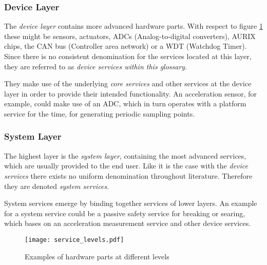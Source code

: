\subsubsection{Device Layer}
The \emph{device layer} contains more advanced hardware parts. With respect to figure \ref{fig:service_levels} these might be sensors, actuators, ADCs (Analog-to-digital converters), AURIX chips, the CAN bus (Controller area network) or a WDT (Watchdog Timer). Since there is no consistent denomination for the services located at this layer, they are referred to as \emph{device services within this glossary}.

They make use of the underlying \emph{core services} and other services at the device layer in order to provide their intended functionality. 
An acceleration sensor, for example, could make use of an ADC, which in turn operates with a platform service for the time, for generating periodic sampling points.

\subsubsection{System Layer}
The highest layer is the \emph{system layer}, containing the most advanced services, which are usually provided to the end user. Like it is the case with the \emph{device services} there exists no uniform denomination throughout literature. Therefore they are denoted \emph{system services}.

System services emerge by binding together services of lower layers. An example for a system service could be a passive safety service for breaking or searing, which bases on an acceleration measurement service and other device services.


\begin{figure}[!htbp]
\centering
\texttt{[image: service\_levels.pdf]}
\caption{Examples of hardware parts at different levels \cite{avl}}
\label{fig:service_levels}
\end{figure}

